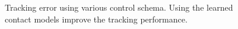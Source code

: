 \begin{figure}[t]
\begin{minipage}{.62\linewidth}
			\caption{Tracking error using various control schema. Using the learned contact models improve the tracking performance.}
			\label{fig:exp3:gating}
		\end{minipage}	
	\end{figure}

% 

